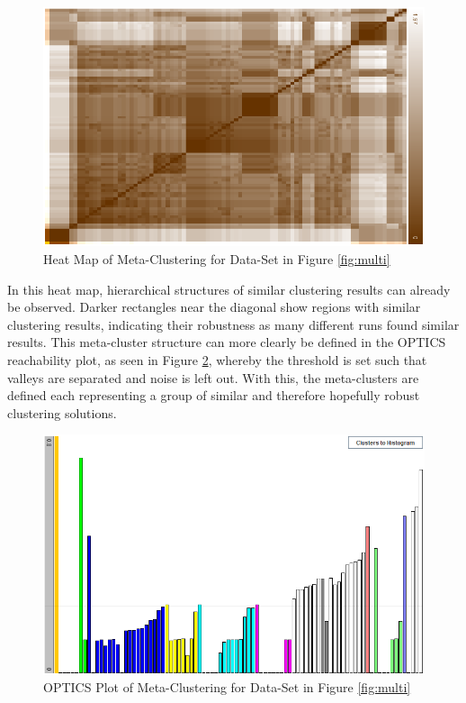 \documentclass[
	a4paper,
	english,
	twoside,
	openright,               
	11pt                            
	]{report}
\begin{document}
\begin{figure}[H]
	\centering
	\includegraphics[scale=.6]{multi_heatmap}
	\caption{Heat Map of Meta-Clustering for Data-Set in Figure \ref{fig:multi}}
	\label{fig:multi_heatmap}
\end{figure}

In this heat map, hierarchical structures of similar clustering results can already be observed. Darker rectangles near the diagonal show regions with similar clustering results, indicating their robustness as many different runs found similar results. This meta-cluster structure can more clearly be defined in the OPTICS reachability plot, as seen in Figure \ref{fig:multi_optics}, whereby the threshold is set such that valleys are separated and noise is left out. With this, the meta-clusters are defined each representing a group of similar and therefore hopefully robust clustering solutions.

\begin{figure}[h]
	\centering
	\includegraphics[scale=.6]{multi_optics}
	\caption{OPTICS Plot of Meta-Clustering for Data-Set in Figure \ref{fig:multi}}
	\label{fig:multi_optics}
\end{figure}
\end{document}
